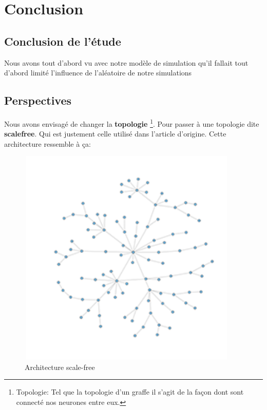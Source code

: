 \hypertarget{conclusion}{%
\chapter{Conclusion}\label{conclusion}}

\section{Conclusion de l'étude}

Nous avons tout d'abord vu avec notre modèle de simulation qu'il fallait tout d'abord limité l'influence de l'aléatoire de notre simulations

\section{Perspectives}

Nous avons envisagé de changer la \textbf{topologie} \footnote{Topologie: Tel que la topologie d'un graffe il s'agit de la façon dont sont connecté nos neurones entre eux.}. Pour passer à une topologie dite \textbf{scalefree}. Qui est justement celle utilisé dans l'article d'origine. Cette architecture ressemble à ça:

\begin{figure}[h!]
\begin{center}
\includegraphics[width=10.5cm,height=10.5cm]{./images/scalefree.png}
\end{center}
\caption{Architecture scale-free}
\label{scale_free}
\end{figure}
